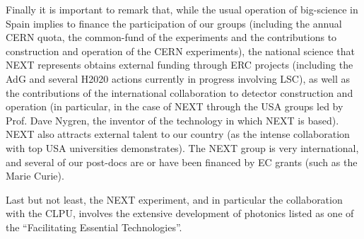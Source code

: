 Finally it is important to remark that, while the usual operation of big-science in Spain implies to finance the participation of our groups (including the annual CERN quota, the common-fund of the experiments and the contributions to construction and operation of the CERN experiments), the national science that NEXT represents obtains external funding through ERC projects (including the AdG and several H2020 actions currently in progress involving LSC), as well as the contributions of the international collaboration to detector construction and operation (in particular, in the case of NEXT through the USA groups led by Prof. Dave Nygren, the inventor of the technology in which NEXT is based). NEXT also attracts external talent to our country (as the intense collaboration with top USA universities demonstrates). The NEXT group is very international, and several of our post-docs are or have been financed by EC grants (such as the Marie Curie). 

Last but not least, the NEXT experiment, and in particular the collaboration with the CLPU, involves the extensive development of photonics listed as one of the  ``Facilitating Essential Technologies''.